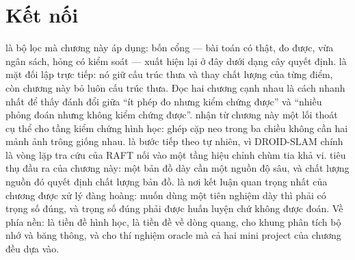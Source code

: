 \documentclass[../../deep_learning.tex]{subfiles}
\begin{document}
\section{Kết nối}
 là bộ lọc mà chương này áp dụng: bốn cổng --- bài toán có thật, đo được, vừa ngân sách, hỏng có kiểm soát --- xuất hiện lại ở đây dưới dạng cây quyết định.  là mặt đối lập trực tiếp: nó giữ cấu trúc thưa và thay chất lượng của từng điểm, còn chương này bỏ luôn cấu trúc thưa. Đọc hai chương cạnh nhau là cách nhanh nhất để thấy đánh đổi giữa ``ít phép đo nhưng kiểm chứng được'' và ``nhiều phỏng đoán nhưng không kiểm chứng được''.  nhận từ chương này một lối thoát cụ thể cho tầng kiểm chứng hình học: ghép cặp neo trong ba chiều không cần hai mảnh ảnh trông giống nhau.  là bước tiếp theo tự nhiên, vì DROID-SLAM chính là vòng lặp tra cứu của RAFT nối vào một tầng hiệu chỉnh chùm tia khả vi.  tiêu thụ đầu ra của chương này: một bản đồ dày cần một nguồn độ sâu, và chất lượng nguồn đó quyết định chất lượng bản đồ.  là nơi kết luận quan trọng nhất của chương được xử lý đàng hoàng: muốn dùng một tiên nghiệm dày thì phải có trọng số đúng, và trọng số đúng phải được huấn luyện chứ không được đoán. Về phía nền:  là tiền đề hình học,  là tiền đề về dòng quang,  cho khung phân tích bộ nhớ và băng thông, và  cho thí nghiệm oracle mà cả hai mini project của chương đều dựa vào.
\end{document}

